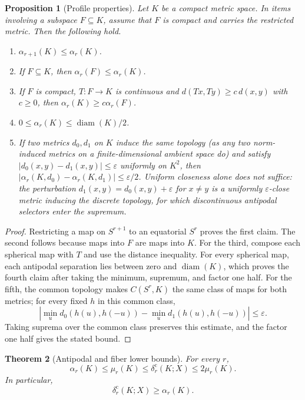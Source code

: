 \documentclass[11pt,a4paper]{article}
\theoremstyle{definition}
\theoremstyle{plain}
\newtheorem{theorem}{Theorem}[section]
\newtheorem{proposition}[theorem]{Proposition}
\theoremstyle{remark}
\DeclareMathOperator{\diam}{diam}
\begin{document}
\begin{proposition}[Profile properties]
\label{prop:profile-properties}
Let $K$ be a compact metric space. In items involving a subspace
$F\subseteq K$, assume that $F$ is compact and carries the restricted
metric. Then the following hold.
\begin{enumerate}
\item $\alpha_{r+1}(K)\leq\alpha_r(K)$.
\item If $F\subseteq K$, then $\alpha_r(F)\leq\alpha_r(K)$.
\item If $F$ is compact, $T:F\to K$ is continuous and
$d(Tx,Ty)\geq c\,d(x,y)$ with $c\ge0$, then
$\alpha_r(K)\geq c\alpha_r(F)$.
\item $0\leq\alpha_r(K)\leq\diam(K)/2$.
\item If two metrics $d_0,d_1$ on $K$ induce the same topology (as any two norm-induced metrics on a finite-dimensional ambient space do) and satisfy
$|d_0(x,y)-d_1(x,y)|\leq\varepsilon$ uniformly on $K^2$, then
$|\alpha_r(K,d_0)-\alpha_r(K,d_1)|\leq\varepsilon/2$. Uniform closeness alone does not suffice: the perturbation $d_1(x,y)=d_0(x,y)+\varepsilon$ for $x\ne y$ is a uniformly $\varepsilon$-close metric inducing the discrete topology, for which discontinuous antipodal selectors enter the supremum.
\end{enumerate}
\end{proposition}

\begin{proof}
Restricting a map on $S^{r+1}$ to an equatorial $S^r$ proves the first
claim. The second follows because maps into $F$ are maps into $K$. For the
third, compose each spherical map with $T$ and use the distance inequality.
For every spherical map, each antipodal separation lies between zero and
$\diam(K)$, which proves the fourth claim after taking the minimum, supremum,
and factor one half. For the fifth, the common topology makes $C(S^r,K)$ the same class of maps for both metrics; for every fixed $h$ in this common class,
\[
\left|\min_u d_0(h(u),h(-u))-
\min_u d_1(h(u),h(-u))\right|\leq\varepsilon.
\]
Taking suprema over the common class preserves this estimate, and the factor one half gives the stated bound.
\end{proof}

\begin{theorem}[Antipodal and fiber lower bounds]
\label{thm:profile-fiber}
For every $r$,
\[
\alpha_r(K)\leq\mu_r(K)
\leq\delta_r^{\mathrm c}(K;X)
\leq2\mu_r(K).
\]
In particular,
\[
\delta_r^{\mathrm c}(K;X)\geq\alpha_r(K).
\]
\end{theorem}
\end{document}
